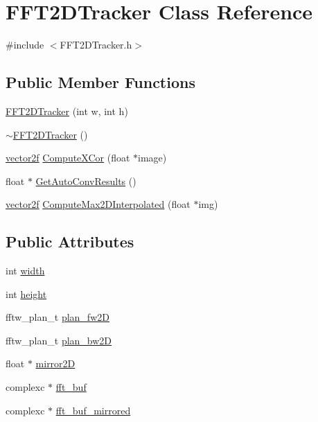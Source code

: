 \hypertarget{class_f_f_t2_d_tracker}{}\section{F\+F\+T2\+D\+Tracker Class Reference}
\label{class_f_f_t2_d_tracker}


{\ttfamily \#include $<$F\+F\+T2\+D\+Tracker.\+h$>$}

\subsection*{Public Member Functions}
\begin{DoxyCompactItemize}
\item 
\hyperlink{class_f_f_t2_d_tracker_aaa109a807ec00addd7e1c0b5faf583c5}{F\+F\+T2\+D\+Tracker} (int w, int h)
\item 
\hyperlink{class_f_f_t2_d_tracker_a79355155c2ca3268cac22e272f8ca550}{$\sim$\+F\+F\+T2\+D\+Tracker} ()
\item 
\hyperlink{std__incl_8h_aba974726076ec2d63a67114c536d123e}{vector2f} \hyperlink{class_f_f_t2_d_tracker_ab8387ba87f83f0e0605e96eab1ca7421}{Compute\+X\+Cor} (float $\ast$image)
\item 
float $\ast$ \hyperlink{class_f_f_t2_d_tracker_adffbefc9db10af5151b0c8a4862b6a4f}{Get\+Auto\+Conv\+Results} ()
\item 
\hyperlink{std__incl_8h_aba974726076ec2d63a67114c536d123e}{vector2f} \hyperlink{class_f_f_t2_d_tracker_aae1858f776337766c223c8eec77dce3e}{Compute\+Max2\+D\+Interpolated} (float $\ast$img)
\end{DoxyCompactItemize}
\subsection*{Public Attributes}
\begin{DoxyCompactItemize}
\item 
int \hyperlink{class_f_f_t2_d_tracker_a3e9fc0e59543897aa47e4f195ed407a1}{width}
\item 
int \hyperlink{class_f_f_t2_d_tracker_a027298d540cbb086c92c63a70e04c40a}{height}
\item 
fftw\+\_\+plan\+\_\+t \hyperlink{class_f_f_t2_d_tracker_ac204a75a497e87e7c43fc38758fba7d2}{plan\+\_\+fw2D}
\item 
fftw\+\_\+plan\+\_\+t \hyperlink{class_f_f_t2_d_tracker_a90c38a2c90a3e0212a85ce7b2d645215}{plan\+\_\+bw2D}
\item 
float $\ast$ \hyperlink{class_f_f_t2_d_tracker_a9e3e37029c015de1f4750964a3ed5701}{mirror2D}
\item 
complexc $\ast$ \hyperlink{class_f_f_t2_d_tracker_ad9f4ba4806399035ae865bc6dcfdfce4}{fft\+\_\+buf}
\item 
complexc $\ast$ \hyperlink{class_f_f_t2_d_tracker_a5d416515e26ec5f4415778227209d52a}{fft\+\_\+buf\+\_\+mirrored}
\end{DoxyCompactItemize}


